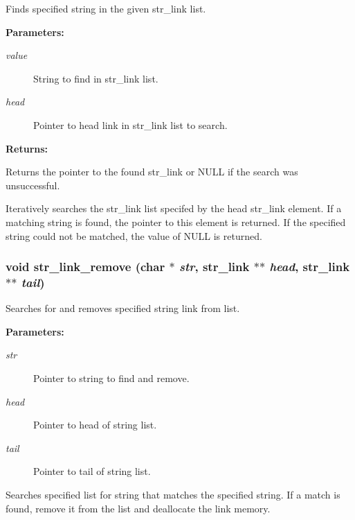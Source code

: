 Finds specified string in the given str\_\-link list.

\begin{Desc}
\item[{\bf Parameters: }]\par
\begin{description}
\item[
{\em value}]String to find in str\_\-link list. \item[
{\em head}]Pointer to head link in str\_\-link list to search. \end{description}
\end{Desc}
\begin{Desc}
\item[{\bf Returns: }]\par
Returns the pointer to the found str\_\-link or NULL if the search was unsuccessful.

\end{Desc}
Iteratively searches the str\_\-link list specifed by the head str\_\-link element. If a matching string is found, the pointer to this element is returned. If the specified string could not be matched, the value of NULL is returned. 
\subsubsection{\setlength{\rightskip}{0pt plus 5cm}void str\_\-link\_\-remove (char $\ast$ {\em str}, {\bf str\_\-link} $\ast$$\ast$ {\em head}, {\bf str\_\-link} $\ast$$\ast$ {\em tail})}\label{link_8h_a16}


Searches for and removes specified string link from list.

\begin{Desc}
\item[{\bf Parameters: }]\par
\begin{description}
\item[
{\em str}]Pointer to string to find and remove. \item[
{\em head}]Pointer to head of string list. \item[
{\em tail}]Pointer to tail of string list.

\end{description}
\end{Desc}
Searches specified list for string that matches the specified string. If a match is found, remove it from the list and deallocate the link memory. 